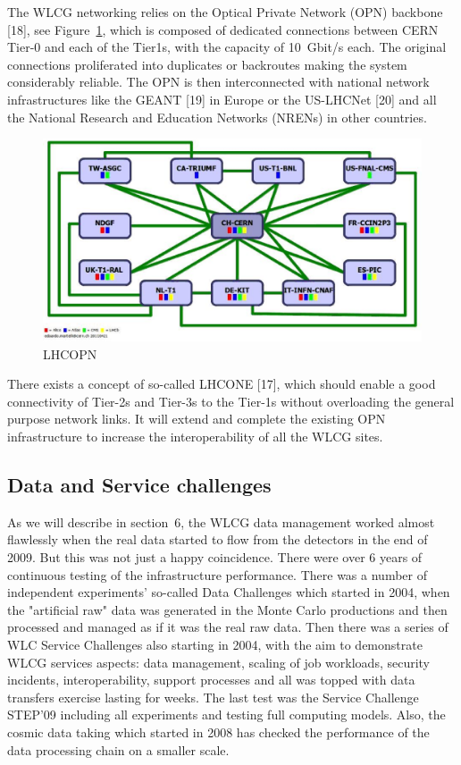 \documentclass{intech}
\begin{document}
The WLCG networking relies on the Optical Private Network (OPN)
backbone [18], see Figure~\ref{fig08}, which is composed of dedicated
connections between CERN Tier-0 and each of the Tier1s, with the
capacity of 10~Gbit/s each. The original connections proliferated
into duplicates or backroutes making the system considerably
reliable. The OPN is then interconnected with national network
infrastructures like the GEANT [19] in Europe or the US-LHCNet [20]
and all the National Research and Education Networks (NRENs) in
other countries.

\begin{figure}[htb] %
\centering
\includegraphics[width=13cm]{fig08.eps} %
\caption{LHCOPN}\label{fig08}
\end{figure}


There exists a concept of so-called LHCONE [17], which should enable
a good connectivity of Tier-2s and Tier-3s to the Tier-1s without
overloading the general purpose network links. It will extend and
complete the existing OPN infrastructure to increase the
interoperability of all the WLCG sites.

\subsection{Data and Service challenges}
%
As we will describe in section~6, the WLCG data management
worked almost flawlessly when the real data started
to flow from the detectors in the end of 2009. But this was not just
a happy coincidence. There were over 6 years of continuous testing
of the infrastructure performance. There was a number of independent
experiments' so-called Data Challenges which started in 2004, when
the "artificial raw" data was generated in the Monte Carlo
productions and then processed and managed as if it was the real raw
data. Then there was a series of WLC Service Challenges also
starting in 2004, with the aim to demonstrate WLCG services aspects:
data management, scaling of job workloads, security incidents,
interoperability, support processes and all was topped with data
transfers exercise lasting for weeks. The last test was the Service
Challenge STEP'09 including all experiments and testing full
computing models. Also, the cosmic data taking which started in 2008
has checked the performance of the data processing chain on a
smaller scale.
\end{document}
